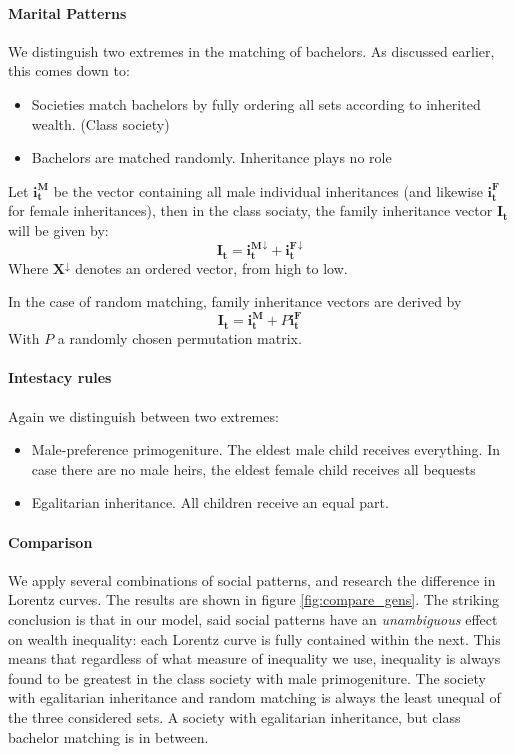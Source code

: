 \paragraph{Marital Patterns} We distinguish two extremes in the matching of bachelors. As discussed earlier, this comes down to:
\begin{itemize}
    \item Societies match bachelors by fully ordering all sets according to inherited wealth. (Class society)
    \item Bachelors are matched randomly. Inheritance plays no role
\end{itemize}

Let $\mathbf{i^M_t}$ be the vector containing all male individual inheritances (and likewise $\mathbf{i^F_t}$ for female inheritances), then in the class sociaty, the family inheritance vector $\mathbf{I_t}$ will be given by:
\begin{equation}
    \mathbf{I_t} = \mathbf{i^M_t}^\downarrow{} + \mathbf{i^F_t}^\downarrow{} 
\end{equation}
Where $\mathbf{X}^\downarrow{}$ denotes an ordered vector, from high to low.

In the case of random matching, family inheritance vectors are derived by
\begin{equation}
    \mathbf{I_t} = \mathbf{i_t^M} + P\mathbf{i_t^F}
\end{equation}
With $P$ a randomly chosen permutation matrix.

\paragraph{Intestacy rules}
Again we distinguish between two extremes:
\begin{itemize}
    \item Male-preference primogeniture. The eldest male child receives everything. In case there are no male heirs, the eldest female child receives all bequests
    \item Egalitarian inheritance. All children receive an equal part.
\end{itemize}

\paragraph{Comparison}

We apply several combinations of social patterns, and research the difference in Lorentz curves. The results are shown in figure \ref{fig:compare_gens}.
The striking conclusion is that in our model, said social patterns have an \emph{unambiguous} effect on wealth inequality: each Lorentz curve is fully contained within the next. This means that regardless of what measure of inequality we use, inequality is always found to be greatest in the class society with male primogeniture. The society with egalitarian inheritance and random matching is always the least unequal of the three considered sets. A society with egalitarian inheritance, but class bachelor matching is in between.

